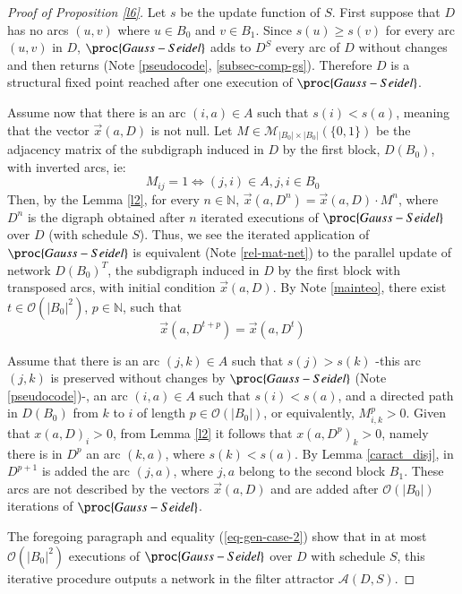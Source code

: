 \documentclass[preprint,12pt]{elsarticle}
\begin{document}
\begin{proof}[Proof of Proposition \ref{l6}]
Let $s$ be the update function of $S$. First suppose that $D$ has no arcs $(u,v)$ where $u \in B_0$ and $v \in B_1$. Since $s(u)\geq s(v)$ for every arc $(u,v)$ in $D$, $\proc{Gauss-Seidel}$ adds to $D^S$ every arc of $D$ without changes and then returns (Note \ref{pseudocode}, \ref{subsec-comp-gs}). Therefore $D$ is a structural fixed point reached after one execution of $\proc{Gauss-Seidel}$.\par

Assume now that there is an arc $(i,a) \in A$ such that $s(i)<s(a)$, meaning that the vector $\vec{x}(a,D)$ is not null. Let $M \in \mathcal{M}_{|B_0|\times |B_0|}(\{0,1\})$ be the adjacency matrix of the subdigraph induced in $D$ by the first block, $D(B_0)$, with inverted arcs, ie:
$$M_{ij}=1 \Longleftrightarrow (j,i)\in A, j,i \in B_0$$
Then, by the Lemma \ref{l2}, for every $n \in \mathbb{N}$, $\vec{x}(a,D^n) =\vec{x}(a,D)\cdot M^n$, where $D^n$ is the digraph obtained after $n$ iterated executions of $\proc{Gauss-Seidel}$ over $D$ (with schedule $S$). Thus, we see the iterated application of $\proc{Gauss-Seidel}$ is equivalent (Note \ref{rel-mat-net}) to the parallel update of network $D(B_0)^T$, the subdigraph induced in $D$ by the first block with transposed arcs, with initial condition $\vec{x}(a,D)$. By Note \ref{mainteo}, there exist $t \in \mathcal{O}(|B_0|^2)$, $p \in \mathbb{N}$, such that 
\begin{equation}\label{eq-gen-case-2}
\vec{x}(a,D^{t+p})=\vec{x}(a,D^{t}) 
\end{equation}

Assume that there is an arc $(j,k) \in A$ such that $s(j)>s(k)$ -this arc $(j,k)$ is preserved without changes by $\proc{Gauss-Seidel}$ (Note \ref{pseudocode})-, an arc $(i,a) \in A$ such that $s(i)<s(a)$, and a directed path in $D(B_0)$ from $k$ to $i$ of length $p \in \mathcal{O}(|B_0|)$, or equivalently, $M_{i,k}^p>0$. Given that $x(a,D)_i > 0$, from Lemma \ref{l2} it follows that $x(a,D^p)_k > 0$, namely there is in $D^p$ an arc $(k,a)$, where $s(k)<s(a)$. By Lemma \ref{caract_disj}, %
in $D^{p+1}$ is added the arc $(j,a)$, where $j, a$
belong to the second block $B_1$. These arcs are not described by the vectors $\vec{x}(a,D)$ %
and are added after 
$\mathcal{O}(|B_0|)$ iterations of $\proc{Gauss-Seidel}$. \par%
The foregoing paragraph and equality (\ref{eq-gen-case-2}) show that in at most $\mathcal{O}(|B_0|^2)$ executions of $\proc{Gauss-Seidel}$ over $D$ with schedule $S$, this iterative procedure outputs a network in the filter attractor $\mathcal{A}(D,S)$.\par
\end{proof}
\end{document}
